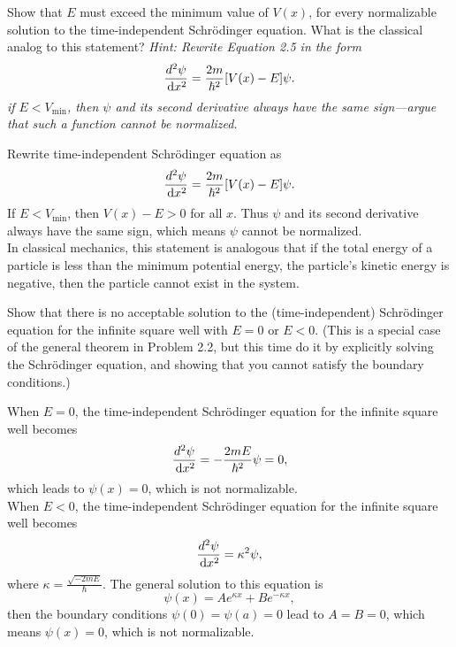 \documentclass[en, oneside]{vivi}
\begin{document}
\begin{prob}
    Show that $E$ must exceed the minimum value of $V(x)$, for every normalizable solution to the time-independent Schrödinger equation. 
    What is the classical analog to this statement? \textit{Hint: Rewrite Equation 2.5 in the form}
    \begin{equation*}
        \frac{d^2\psi}{ \dif x^2} = \frac{2m}{\hbar^2} [V(x) - E] \psi.
    \end{equation*}
    \textit{if $E < V_{\min}$, then $\psi$ and its second derivative always have the same sign—argue that such a function cannot be normalized.}
\end{prob}

\begin{sol}
    Rewrite time-independent Schrödinger equation as
    \begin{equation*}
        \frac{d^2\psi}{ \dif x^2} = \frac{2m}{\hbar^2} [V(x) - E] \psi.
    \end{equation*}
    If $E < V_{\min}$, then $V(x) - E > 0$ for all $x$. Thus $\psi$ and its second derivative always have the same sign, which means $\psi$ cannot be normalized.\\
    In classical mechanics, this statement is analogous that if the total energy of a particle is less than the minimum potential energy, the particle's kinetic energy is negative, then the particle cannot exist in the system.
\end{sol}

\begin{prob}
    Show that there is no acceptable solution to the (time-independent) Schrödinger equation for the infinite square well with $E = 0$ or $E < 0$. 
    (This is a special case of the general theorem in Problem 2.2, but this time do it by explicitly solving the Schrödinger equation, 
    and showing that you cannot satisfy the boundary conditions.)
\end{prob}

\begin{sol}
    When $E = 0$, the time-independent Schrödinger equation for the infinite square well becomes
    \begin{equation*}
        \frac{d^2\psi}{ \dif x^2} = -\frac{2mE}{\hbar^2} \psi = 0,
    \end{equation*}
    which leads to $\psi(x) = 0$, which is not normalizable.\\
    When $E < 0$, the time-independent Schrödinger equation for the infinite square well becomes
    \begin{equation*}
        \frac{d^2\psi}{ \dif x^2} = \kappa^2 \psi,
    \end{equation*}
    where $\kappa = \frac{\sqrt{-2mE}}{\hbar}$. The general solution to this equation is
    \begin{equation*}
        \psi(x) = A e^{\kappa x} + B e^{-\kappa x},
    \end{equation*}
    then the boundary conditions $\psi(0) = \psi(a) = 0$ lead to $A = B = 0$, which means $\psi(x) = 0$, which is not normalizable.
\end{sol}
\end{document}
